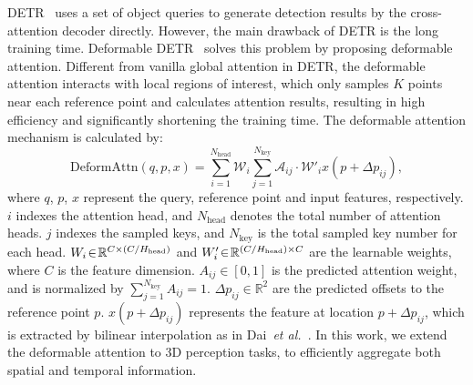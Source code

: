 \documentclass{article}
\newcommand{\etal}{\textit{et al.}}
\def\etal{{\em et al.~}}
\begin{document}
DETR~\cite{carion2020end} uses a set of object queries to generate detection results by the cross-attention decoder directly.
However, the main drawback of DETR is the long training time. Deformable DETR~\cite{zhu2020deformable}  solves this problem by proposing deformable attention.
Different from vanilla global attention in DETR, the deformable attention interacts with local regions of interest, which only samples $K$ points near each reference point and calculates attention results, resulting in high efficiency and significantly shortening the training time. The deformable attention mechanism is calculated by:
\begin{equation}
\text{DeformAttn}(q, p, x) = \sum_{i=1}^{N_\text{head}} \mathcal{W}_i\sum_{j=1}^{N_\text{key}} \mathcal{A}_{ij} \cdot \mathcal{W}'_i x(p+ \Delta p_{ij}),
\label{eq:single_deform_attn_fun}
\end{equation}
where $q$, $p$, $x$ represent the query, reference point and input features, respectively. $i$ indexes the attention head, and $N_\text{head}$ denotes the total number of attention heads.
$j$ indexes the sampled keys, and $N_\text{key}$ is the total sampled key
number for each head.
$W_i\!\in\!\mathbb{R}^{C\times (C / H_{\rm head})}$ and $W'_i\!\in\!\mathbb{R}^{(C / H_{\rm head})\times C}$ are the learnable weights, where $C$ is the feature dimension. $A_{ij}\!\in\![0,1]$ is the predicted attention weight, and is normalized by $\sum_{j=1}^{N_\text{key}} A_{ij}\!= \!1$. $\Delta p_{ij}\!\in\!\mathbb{R}^2$ are the predicted offsets to the reference point $p$. $x(p + \Delta p_{ij})$ represents the feature at location $p + \Delta p_{ij}$, which is 
extracted by bilinear interpolation as in Dai~\etal\cite{dai2017deformable}.
In this work, we extend the deformable attention to 3D perception tasks, to efficiently aggregate both spatial and temporal information.
\end{document}
